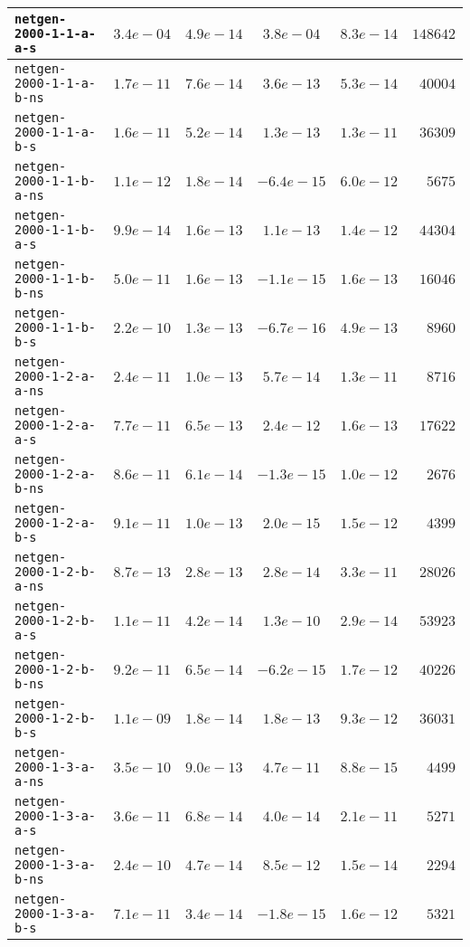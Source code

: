 \begin{center}
\begin{longtable}{|l || c | c | c | c | r|}
\hline
\texttt{netgen-2000-1-1-a-a-s} & $3.4e-04$ & $4.9e-14$ & $3.8e-04$ & $8.3e-14$ & $148642$ \\
\hline
\texttt{netgen-2000-1-1-a-b-ns} & $1.7e-11$ & $7.6e-14$ & $3.6e-13$ & $5.3e-14$ & $40004$ \\
\hline
\texttt{netgen-2000-1-1-a-b-s} & $1.6e-11$ & $5.2e-14$ & $1.3e-13$ & $1.3e-11$ & $36309$ \\
\hline
\texttt{netgen-2000-1-1-b-a-ns} & $1.1e-12$ & $1.8e-14$ & $-6.4e-15$ & $6.0e-12$ & $5675$ \\
\hline
\texttt{netgen-2000-1-1-b-a-s} & $9.9e-14$ & $1.6e-13$ & $1.1e-13$ & $1.4e-12$ & $44304$ \\
\hline
\texttt{netgen-2000-1-1-b-b-ns} & $5.0e-11$ & $1.6e-13$ & $-1.1e-15$ & $1.6e-13$ & $16046$ \\
\hline
\texttt{netgen-2000-1-1-b-b-s} & $2.2e-10$ & $1.3e-13$ & $-6.7e-16$ & $4.9e-13$ & $8960$ \\
\hline
\texttt{netgen-2000-1-2-a-a-ns} & $2.4e-11$ & $1.0e-13$ & $5.7e-14$ & $1.3e-11$ & $8716$ \\
\hline
\texttt{netgen-2000-1-2-a-a-s} & $7.7e-11$ & $6.5e-13$ & $2.4e-12$ & $1.6e-13$ & $17622$ \\
\hline
\texttt{netgen-2000-1-2-a-b-ns} & $8.6e-11$ & $6.1e-14$ & $-1.3e-15$ & $1.0e-12$ & $2676$ \\
\hline
\texttt{netgen-2000-1-2-a-b-s} & $9.1e-11$ & $1.0e-13$ & $2.0e-15$ & $1.5e-12$ & $4399$ \\
\hline
\texttt{netgen-2000-1-2-b-a-ns} & $8.7e-13$ & $2.8e-13$ & $2.8e-14$ & $3.3e-11$ & $28026$ \\
\hline
\texttt{netgen-2000-1-2-b-a-s} & $1.1e-11$ & $4.2e-14$ & $1.3e-10$ & $2.9e-14$ & $53923$ \\
\hline
\texttt{netgen-2000-1-2-b-b-ns} & $9.2e-11$ & $6.5e-14$ & $-6.2e-15$ & $1.7e-12$ & $40226$ \\
\hline
\texttt{netgen-2000-1-2-b-b-s} & $1.1e-09$ & $1.8e-14$ & $1.8e-13$ & $9.3e-12$ & $36031$ \\
\hline
\texttt{netgen-2000-1-3-a-a-ns} & $3.5e-10$ & $9.0e-13$ & $4.7e-11$ & $8.8e-15$ & $4499$ \\
\hline
\texttt{netgen-2000-1-3-a-a-s} & $3.6e-11$ & $6.8e-14$ & $4.0e-14$ & $2.1e-11$ & $5271$ \\
\hline
\texttt{netgen-2000-1-3-a-b-ns} & $2.4e-10$ & $4.7e-14$ & $8.5e-12$ & $1.5e-14$ & $2294$ \\
\hline
\texttt{netgen-2000-1-3-a-b-s} & $7.1e-11$ & $3.4e-14$ & $-1.8e-15$ & $1.6e-12$ & $5321$ \\

\end{longtable}
\end{center}
